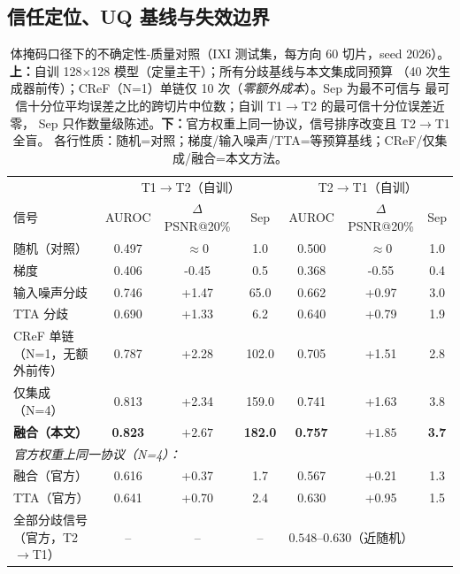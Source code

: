 \documentclass[11pt]{article}
\begin{document}
\subsection{信任定位、UQ 基线与失效边界}
\label{sec:exp-uq}
\begin{table}[t]
\centering\small
\caption{体掩码口径下的不确定性-质量对照（IXI 测试集，每方向 60 切片，seed 2026）。
\textbf{上：}自训 128$\times$128 模型（定量主干）；所有分歧基线与本文集成同预算
（40 次生成器前传）；CReF（N=1）单链仅 10 次（\emph{零额外成本}）。Sep 为最不可信与
最可信十分位平均误差之比的跨切片中位数；自训 T1$\to$T2 的最可信十分位误差近零，
Sep 只作数量级陈述。\textbf{下：}官方权重上同一协议，信号排序改变且 T2$\to$T1 全盲。
各行性质：随机=对照；梯度/输入噪声/TTA=等预算基线；CReF/仅集成/融合=本文方法。}
\label{tab:uq}
\begin{tabular}{lcccccc}
\toprule
 & \multicolumn{3}{c}{T1$\to$T2（自训）} & \multicolumn{3}{c}{T2$\to$T1（自训）} \\
信号 & AUROC & $\Delta$PSNR@20\% & Sep & AUROC & $\Delta$PSNR@20\% & Sep \\
\midrule
随机（对照） & 0.497 & $\approx$0 & 1.0 & 0.500 & $\approx$0 & 1.0 \\
梯度 & 0.406 & -0.45 & 0.5 & 0.368 & -0.55 & 0.4 \\
输入噪声分歧 & 0.746 & +1.47 & 65.0 & 0.662 & +0.97 & 3.0 \\
TTA 分歧 & 0.690 & +1.33 & 6.2 & 0.640 & +0.79 & 1.9 \\
CReF 单链（N=1，无额外前传） & 0.787 & +2.28 & 102.0 & 0.705 & +1.51 & 2.8 \\
仅集成（N=4） & 0.813 & +2.34 & 159.0 & 0.741 & +1.63 & 3.8 \\
\textbf{融合（本文）} & \textbf{0.823} & $\mathbf{+2.67}$ & \textbf{182.0} & \textbf{0.757} & $\mathbf{+1.85}$ & \textbf{3.7} \\
\midrule
\multicolumn{7}{l}{\emph{官方权重上同一协议（N=4）：}} \\
融合（官方） & 0.616 & +0.37 & 1.7 & 0.567 & +0.21 & 1.3 \\
TTA（官方） & 0.641 & +0.70 & 2.4 & 0.630 & +0.95 & 1.5 \\
全部分歧信号（官方，T2$\to$T1） & -- & -- & -- & \multicolumn{3}{l}{$0.548$--$0.630$（近随机）} \\
\bottomrule
\end{tabular}
\end{table}
\end{document}
